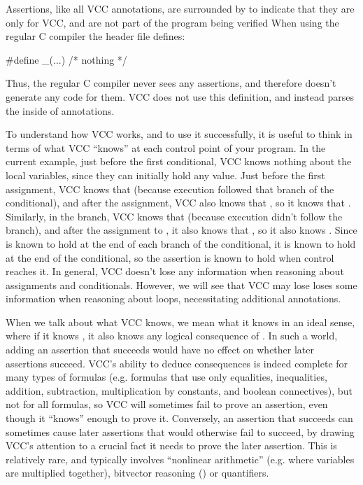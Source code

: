 Assertions, like all VCC annotations, 
are surrounded by  to indicate that they are
only for VCC, and are not part of the program being verified
When using the regular C compiler the  header file defines:
\begin{VCC}
#define _(...) /* nothing */
\end{VCC}
Thus, the regular C compiler never sees any assertions, and therefore
doesn't generate any code for them.
VCC does not use this definition, and instead parses the inside of 
annotations.%



To understand how VCC works, and to use it successfully, it is useful to
think in terms of what VCC ``knows'' at each control point
of your program. In the current example, just before the first conditional,
VCC  knows nothing about the local variables,
since they can initially hold any value. 
Just before the first assignment, VCC knows that 
 (because execution followed that branch of the conditional), and
after the assignment, VCC also knows that , 
so it knows that . Similarly, in the  branch,
VCC knows that  (because execution didn't follow the
 branch), and after the assignment to , it also knows
that , so it also knows . Since 
 is known to hold at the end of each branch of the
conditional, it is known to hold at the end of the conditional, so the
assertion is known to hold when control reaches it.
In general,
VCC doesn't lose any information when reasoning about assignments and
conditionals. However, we will see that VCC may lose
loses some information when reasoning about loops,
necessitating additional annotations.

When we talk about what VCC knows, we mean what it knows in an ideal
sense, where if it knows , it also knows any logical
consequence of . In such a world, adding an assertion that
succeeds would have no effect on whether later assertions succeed.
VCC's ability to deduce consequences is indeed complete for many types
of formulas (e.g. formulas that use only equalities,
inequalities, addition, subtraction, multiplication by constants, and
boolean connectives), but not for all formulas, so VCC will
sometimes fail to prove an assertion, even though it ``knows'' enough
to prove it.  Conversely, an assertion that succeeds can sometimes cause later assertions that
would otherwise fail to succeed, by drawing VCC's attention to a
crucial fact it needs to prove the later assertion.  This is
relatively rare, and typically involves ``nonlinear arithmetic''
(e.g. where variables are multiplied together), bitvector reasoning
() or quantifiers.

